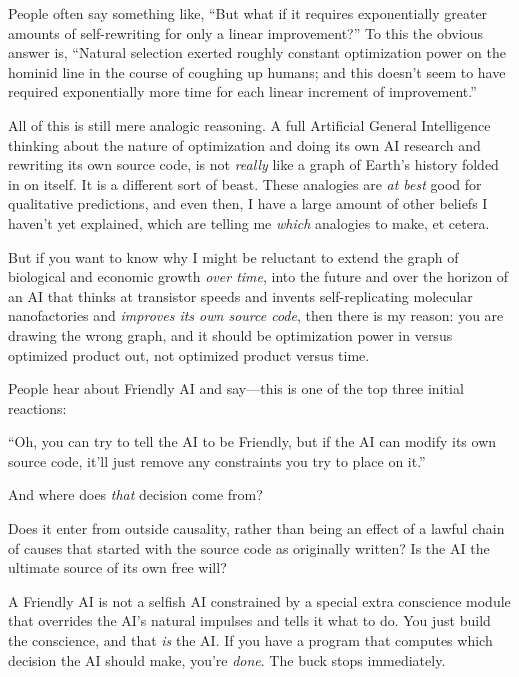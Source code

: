 {{
 People often say something like, ``But what if it
requires exponentially greater amounts of self-rewriting for only a
linear improvement?'' To this the obvious answer is,
``Natural selection exerted roughly constant
optimization power on the hominid line in the course of coughing up
humans; and this doesn't seem to have required
exponentially more time for each linear increment of
improvement.''}

{
 All of this is still mere analogic reasoning. A full Artificial
General Intelligence thinking about the nature of optimization and
doing its own AI research and rewriting its own source code, is not
\textit{really} like a graph of Earth's history folded
in on itself. It is a different sort of beast. These analogies are
\textit{at best} good for qualitative predictions, and even then, I
have a large amount of other beliefs I haven't yet
explained, which are telling me \textit{which} analogies to make, et
cetera.}

{
 But if you want to know why I might be reluctant to extend the
graph of biological and economic growth \textit{over time}, into the
future and over the horizon of an AI that thinks at transistor speeds
and invents self-replicating molecular nanofactories and
\textit{improves its own source code}, then there is my reason: you are
drawing the wrong graph, and it should be optimization power in versus
optimized product out, not optimized product versus time.}

\myendsectiontext


{
 People hear about Friendly AI and say---this is one of the top
three initial reactions: }

{
 ``Oh, you can try to tell the AI to be Friendly,
but if the AI can modify its own source code, it'll
just remove any constraints you try to place on
it.''}

{
 And where does \textit{that} decision come from?}

{
 Does it enter from outside causality, rather than being an effect
of a lawful chain of causes that started with the source code as
originally written? Is the AI the ultimate source of its own free
will?}

{
 A Friendly AI is not a selfish AI constrained by a special extra
conscience module that overrides the AI's natural
impulses and tells it what to do. You just build the conscience, and
that \textit{is} the AI. If you have a program that computes which
decision the AI should make, you're \textit{done}. The
buck stops immediately.}

}
